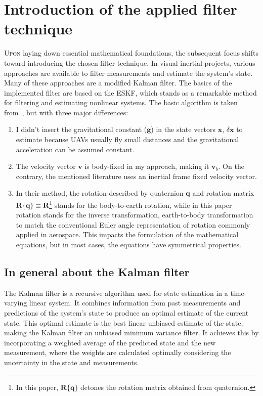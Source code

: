 \chapter{Introduction of the applied filter technique}\label{chap:eskf}

\lettrine{U}{pon} laying down essential mathematical foundations, the subsequent focus shifts toward introducing the chosen filter technique. In visual-inertial projects, various approaches are available to filter measurements and estimate the system's state. Many of these approaches are a modified Kalman filter. The basics of the implemented filter are based on the ESKF, which stands as a remarkable method for filtering and estimating nonlinear systems. The basic algorithm is taken from~\cite{quaternion-eskf}, but with three major differences:
\begin{enumerate}
    \item 
    I didn't insert the gravitational constant ($\mathbf{g}$)  in the state vectors $\mathbf{x}$, $\delta\mathbf{x}$ to estimate because UAVs usually fly small distances and the gravitational acceleration can be assumed constant.
    
    \item
    The velocity vector $\mathbf{v}$ is body-fixed in my approach, making it $\mathbf{v}_b$. On the contrary, the mentioned literature uses an inertial frame fixed velocity vector.
    
    \item 
    In their method, the rotation described by quaternion $\mathbf{q}$ and rotation matrix $\mathbf{R}\{\mathbf{q}\}\equiv\mathbf{R}$\footnote{In this paper, $\mathbf{R}\{\mathbf{q}\}$ detones the rotation matrix obtained from quaternion.} stands for the body-to-earth rotation, while in this paper rotation stands for the inverse transformation, earth-to-body transformation to match the conventional Euler angle representation of rotation commonly applied in aerospace. This impacts the formulation of the mathematical equations, but in most cases, the equations have symmetrical properties.
\end{enumerate}

\section{In general about the Kalman filter}

The Kalman filter is a recursive algorithm used for state estimation in a time-varying linear system. It combines information from past measurements and predictions of the system's state to produce an optimal estimate of the current state. This optimal estimate is the best linear unbiased estimate of the state, making the Kalman filter an unbiased minimum variance filter. It achieves this by incorporating a weighted average of the predicted state and the new measurement, where the weights are calculated optimally considering the uncertainty in the state and measurements.

